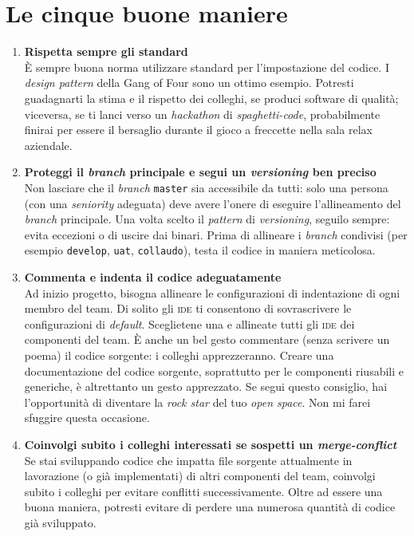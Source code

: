 \section{Le cinque buone maniere}

\begin{enumerate}

\item \textbf{Rispetta sempre gli standard} \\
È sempre buona norma utilizzare standard per l’impostazione del codice. I \emph{design pattern} della Gang of Four sono un ottimo esempio. Potresti guadagnarti la stima e il rispetto dei colleghi, se produci software di qualità; viceversa, se ti lanci verso un \emph{hackathon} di \emph{spaghetti-code}, probabilmente finirai per essere il bersaglio durante il gioco a freccette nella sala relax aziendale.

\item \textbf{Proteggi il \emph{branch} principale e segui un \emph{versioning} ben preciso} \\
Non lasciare che il \emph{branch} \texttt{master} sia accessibile da tutti: solo una persona (con una \emph{seniority} adeguata) deve avere l’onere di eseguire l’allineamento del \emph{branch} principale. Una volta scelto il \emph{pattern} di \emph{versioning}, seguilo sempre: evita eccezioni o di uscire dai binari. Prima di allineare i \emph{branch} condivisi (per esempio \texttt{develop}, \texttt{uat}, \texttt{collaudo}), testa il codice in maniera meticolosa.

\item \textbf{Commenta e indenta il codice adeguatamente} \\
Ad inizio progetto, bisogna allineare le configurazioni di indentazione di ogni membro del team. Di solito gli \textsc{ide} ti consentono di sovrascrivere le configurazioni di \emph{default}. Sceglietene una e allineate tutti gli \textsc{ide} dei componenti del team. È anche un bel gesto commentare (senza scrivere un poema) il codice sorgente: i colleghi apprezzeranno. Creare una documentazione del codice sorgente, soprattutto per le componenti riusabili e generiche, è altrettanto un gesto apprezzato. Se segui questo consiglio, hai l’opportunità di diventare la \emph{rock star} del tuo \emph{open space}. Non mi farei sfuggire questa occasione.

\item \textbf{Coinvolgi subito i colleghi interessati se sospetti un \emph{merge-conflict}} \\
Se stai sviluppando codice che impatta file sorgente attualmente in lavorazione (o già implementati) di altri componenti del team, coinvolgi subito i colleghi per evitare conflitti successivamente. Oltre ad essere una buona maniera, potresti evitare di perdere una numerosa quantità di codice già sviluppato.


\end{enumerate}
